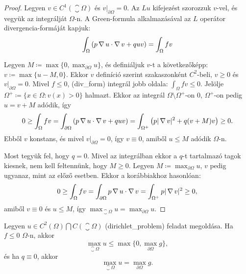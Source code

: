 \begin{proof} \cite{kar-kor}
	Legyen $v \in C^1(\closure{\Omega})$ és $v|_{\partial\Omega}=0$. Az $Lu$ kifejezést szorozzuk $v$-vel, és vegyük az integrálját $\Omega$-n. A Green-formula alkalmazásával az $L$ operátor divergencia-formáját kapjuk:
	\begin{equation}
	\label{div_form}
		\int_{\Omega} \left( p \operatorname{\nabla} u \cdot \operatorname{\nabla} v + q u v \right) = \int_{\Omega} f v 
	\end{equation}
	
	
	Legyen $M \coloneqq \max \{0, \max_{\partial\Omega} u\}$, és definiáljuk $v$-t a következőképp: $v \coloneqq \max \{u-M,0\}$. Ekkor $v$ definíció szerint szakaszonként $C^2$-beli, $v \geq 0$ és $v|_{\partial\Omega} = 0$. Mivel $f \leq 0$, \aref({div_form}) integrál jobb oldala:  $\int_{\Omega} f v  \leq 0$. 
	Jelölje $\Omega^{+} \coloneqq \{x \in \Omega : v(x) > 0\}$ halmazt. Ekkor az integrál $\Omega \setminus \Omega^{+}$-on 0, $\Omega^{+}$-on pedig $u = v + M$ adódik, így	
	\begin{equation*}
		0 \geq \int_{\Omega}  f v  = \int_{\partial\Omega} \left( p \operatorname{\nabla} u \cdot \operatorname{\nabla} v + q  u v \right) = \int_{\Omega^{+}} \left( p |\operatorname{\nabla} v|^2  + q  (v + M) v \right) \geq 0.
	\end{equation*}	
	Ebből $v$ konstans, és mivel $v|_{\partial\Omega} = 0$, így $v \equiv 0$, amiből $u \leq M$ adódik $\Omega$-n.
	
	Most tegyük fel, hogy $q = 0$. Mivel az integrálban ekkor a $q$-t tartalmazó tagok kiesnek, nem kell feltennünk, hogy $M \geq 0$. Legyen $M \coloneqq \max_{\partial\Omega} u$, $v$ pedig ugyanaz, mint az előző esetben. Ekkor a korábbiakhoz hasonlóan:	
	\begin{equation*}
		0 \geq \int_{\Omega} f v  = \int_{\partial\Omega}  p \operatorname{\nabla} u \cdot \operatorname{\nabla} v   = \int_{\Omega^{+}} p |\operatorname{\nabla} v|^2  \geq 0,
	\end{equation*}	
	amiből $v \equiv 0$ és $u \leq M$, így $\max_{\closure{\Omega}} u =  \max_{\partial\Omega} u$.
\end{proof}

\begin{corollary}\label{cmaxelv}
	Legyen $u \in C^2(\Omega) \bigcap C(\closure{\Omega})$ \aref({dirichlet_problem}) feladat megoldása. Ha $f \leq 0$ $\Omega$-n, akkor
	\begin{equation*}
		\max_{\closure{\Omega}} u \leq \max \{0, \max_{\partial\Omega} g\},
	\end{equation*}
	 és ha $q \equiv 0$, akkor
	\begin{equation*}
		\max_{\closure{\Omega}} u =  \max_{\partial\Omega} g .
	\end{equation*}
\end{corollary}

